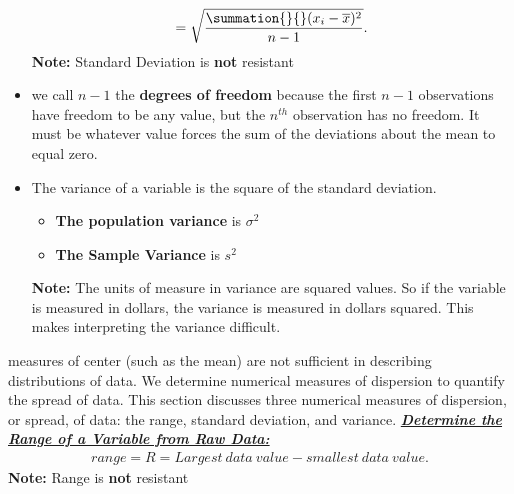 \documentclass{report}
\begin{document}
\begin{itemize}
\begin{align*}
                    = \sqrt{\frac{\summation{}{}(x_{i}-\overline{x})^{2}}{n-1}}
                .\end{align*}
                \textbf{Note:} Standard Deviation is \textbf{not} resistant
            \item  we call $n-1$ the \textbf{degrees of freedom} because the first $n-1 $  observations have freedom to be any value, but the $n^{th}$ observation has no freedom. It must be whatever value forces the sum of the deviations about the mean to equal zero.
            \item The variance of a variable is the square of the standard deviation.
                \begin{itemize}
                    \item  \textbf{The population variance} is \textbf{$\sigma^{2}$} 
                    \item \textbf{The Sample Variance} is $s^{2}$
                \end{itemize}
                \textbf{Note:} The units of measure in variance are squared values. So if the variable is measured in dollars, the variance is measured in dollars squared. This makes interpreting the variance difficult.
        \end{itemize}
        \bigbreak \noindent 
        measures of center (such as the mean) are not sufficient in describing distributions of data. We determine numerical measures of dispersion to quantify the spread of data. This section discusses three numerical measures of dispersion, or spread, of data: the range, standard deviation, and variance.
        \bigbreak \noindent \bigbreak \noindent 
        \textbf{\textit{\underline{Determine the Range of a Variable from Raw Data:}}}
        \begin{align*}
            range = R = Largest\ data\ value- smallest\ data\ value
        .\end{align*}
        \bigbreak \noindent 
        \textbf{Note:} Range is \textbf{not} resistant
\end{document}
